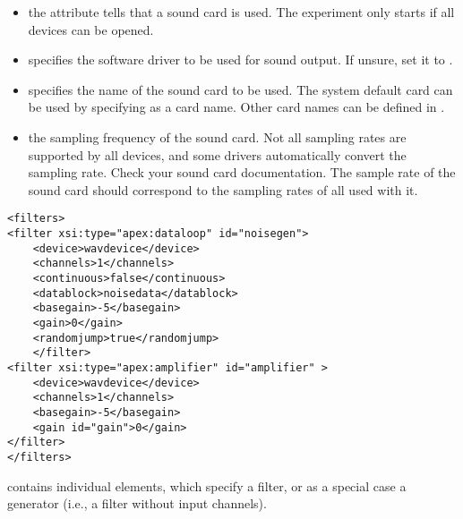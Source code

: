 \begin{itemize}
\item {} the 
attribute tells \apex that a sound card is used. The experiment
only starts if all devices can be opened.

\item {} specifies the software driver to be used
for sound output. If unsure, set it to .

\item {} specifies the name of the sound card to be
used. The system default card can be used by specifying
 as a card name. Other card names can be defined in
.

\item {} the sampling frequency of the sound
card. Not all sampling rates are supported by all devices, and
some drivers automatically convert the sampling rate. Check your
sound card documentation. The sample rate of the sound card should
correspond to the sampling rates of all  used
with it.
\end{itemize}

   
 

\begin{lstlisting}
<filters>
<filter xsi:type="apex:dataloop" id="noisegen">
    <device>wavdevice</device>
    <channels>1</channels>
    <continuous>false</continuous>
    <datablock>noisedata</datablock>
    <basegain>-5</basegain>
    <gain>0</gain>
    <randomjump>true</randomjump>
    </filter>
<filter xsi:type="apex:amplifier" id="amplifier" >
    <device>wavdevice</device>
    <channels>1</channels>
    <basegain>-5</basegain>
    <gain id="gain">0</gain>
</filter>
</filters>
\end{lstlisting}

 contains individual  elements,
which specify a filter, or as a special case a generator (i.e., a
filter without input channels).

